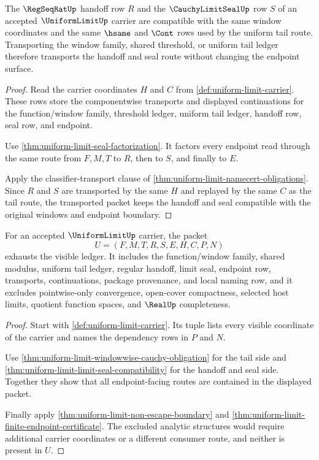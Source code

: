 \begin{theorem}
\label{thm:uniform-limit-limit-seal-compatibility}
The $\RegSeqRatUp$ handoff row $R$ and the $\CauchyLimitSealUp$ row $S$ of an accepted $\UniformLimitUp$ carrier are compatible with the same window coordinates and the same $\hsame$ and $\Cont$ rows used by the uniform tail route. Transporting the window family, shared threshold, or uniform tail ledger therefore transports the handoff and seal route without changing the endpoint surface.
\end{theorem}
\begin{proof}
Read the carrier coordinates $H$ and $C$ from \autoref{def:uniform-limit-carrier}. These rows store the componentwise transports and displayed continuations for the function/window family, threshold ledger, uniform tail ledger, handoff row, seal row, and endpoint.

Use \autoref{thm:uniform-limit-seal-factorization}. It factors every endpoint read through the same route from $F,M,T$ to $R$, then to $S$, and finally to $E$.

Apply the classifier-transport clause of \autoref{thm:uniform-limit-namecert-obligations}. Since $R$ and $S$ are transported by the same $H$ and replayed by the same $C$ as the tail route, the transported packet keeps the handoff and seal compatible with the original windows and endpoint boundary.
\end{proof}

\begin{theorem}
\label{thm:uniform-limit-ledger-exactness-obligation}
For an accepted $\UniformLimitUp$ carrier, the packet
$$
U=(F,M,T,R,S,E,H,C,P,N)
$$
exhausts the visible ledger. It includes the function/window family, shared modulus, uniform tail ledger, regular handoff, limit seal, endpoint row, transports, continuations, package provenance, and local naming row, and it excludes pointwise-only convergence, open-cover compactness, selected host limits, quotient function spaces, and $\RealUp$ completeness.
\end{theorem}
\begin{proof}
Start with \autoref{def:uniform-limit-carrier}. Its tuple lists every visible coordinate of the carrier and names the dependency rows in $P$ and $N$.

Use \autoref{thm:uniform-limit-windowwise-cauchy-obligation} for the tail side and \autoref{thm:uniform-limit-limit-seal-compatibility} for the handoff and seal side. Together they show that all endpoint-facing routes are contained in the displayed packet.

Finally apply \autoref{thm:uniform-limit-non-escape-boundary} and \autoref{thm:uniform-limit-finite-endpoint-certificate}. The excluded analytic structures would require additional carrier coordinates or a different consumer route, and neither is present in $U$.
\end{proof}

